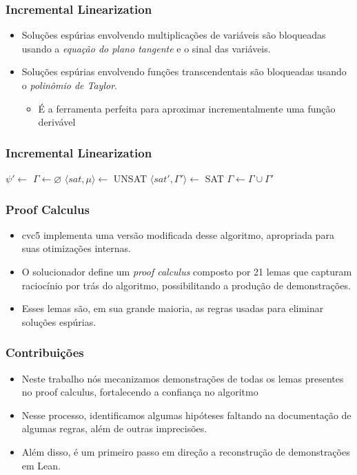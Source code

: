 \documentclass[usepdftitle=false,aspectratio=169,usenames,dvipsnames]{beamer}
\newcommand\vitem{\vfill\item}
\begin{document}
\begin{frame}
  \frametitle{Incremental Linearization}
  \begin{itemize}
  \item Soluções espúrias envolvendo multiplicações de variáveis são bloqueadas usando a \textit{equação do plano tangente} e o sinal das variáveis.
  \vitem Soluções espúrias envolvendo funções transcendentais são bloqueadas usando o \textit{polinômio de Taylor}.
          \begin{itemize}
                  \item É a ferramenta perfeita para aproximar incrementalmente uma função derivável
          \end{itemize}
  \end{itemize}
\end{frame}

\begin{frame}
  \frametitle{Incremental Linearization}
  \begin{algorithmic}[1]
      \State $\psi' \gets$ 
      \State $\Gamma \gets \varnothing$
        \State $\langle sat, \mu \rangle \gets $
          \Return UNSAT
        \EndIf
        \State $\langle sat', \Gamma' \rangle \gets $
          \Return SAT
        \EndIf
        \State $\Gamma \gets \Gamma \cup \Gamma'$
      \EndWhile
    \EndFunction
  \end{algorithmic}
\end{frame}

\begin{frame}
  \frametitle{Proof Calculus}
  \begin{itemize}
    \item cvc5 implementa uma versão modificada desse algoritmo, apropriada para suas otimizações internas.
    \vitem O solucionador define um \textit{proof calculus} composto por 21 lemas que capturam raciocínio por trás do algoritmo, possibilitando a produção de demonstrações.
    \vitem Esses lemas são, em sua grande maioria, as regras usadas para eliminar soluções espúrias.
  \end{itemize}
\end{frame}

\begin{frame}
  \frametitle{Contribuições}
  \begin{itemize}
    \item Neste trabalho nós mecanizamos demonstrações de todas os lemas presentes no proof calculus, fortalecendo a confiança no algoritmo
    \vitem Nesse processo, identificamos algumas hipóteses faltando na documentação de algumas regras, além de outras imprecisões.
    \vitem Além disso, é um primeiro passo em direção a reconstrução de demonstrações em Lean.

  \end{itemize}
\end{frame}
\end{document}
